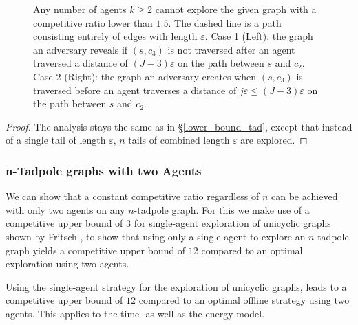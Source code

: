 \begin{figure}[H]
\begin{center}
    \end{center}
    \small\caption[Tadpole lower bound]{Any number of agents $k\geq2$ cannot explore the given graph with a competitive ratio lower than $1.5$. The dashed line is a path consisting entirely of edges with length $\varepsilon$.
    Case 1 (Left): the graph an adversary reveals if $(s, c_3)$ is not traversed after an agent traversed a distance of $(J-3)\varepsilon$ on the path between $s$ and $c_2$.
    Case 2 (Right): the graph an adversary creates when $(s,c_3)$ is traversed before an agent traverses a distance of $j\varepsilon\leq(J-3)\varepsilon$ on the path between $s$ and $c_2$.}
    \label{ntadpole-time}
\end{figure}

\begin{proof}
    The analysis stays the same as in \S\ref{lower_bound_tad}, except that instead of a single tail of length $\varepsilon$, $n$ tails of combined length $\varepsilon$ are explored.
\end{proof}

\subsubsection{n-Tadpole graphs with two Agents}\label{ntad_two}
We can show that a constant competitive ratio regardless of $n$ can be achieved with only two agents on any $n$-tadpole graph. 
For this we make use of a competitive upper bound of $3$ for single-agent exploration of unicyclic graphs shown by Fritsch \cite{Fritsch2021},
to show that using only a single agent to explore an $n$-tadpole graph yields a competitive upper bound of $12$ compared to an optimal exploration using two agents.


\begin{theorem}\label{nTadpoleUpperTwo}
    Using the single-agent strategy for the exploration of unicyclic graphs, leads to a competitive upper bound of $12$ compared to
    an optimal offline strategy using two agents. This applies to the time- as well as the energy model.
\end{theorem}



